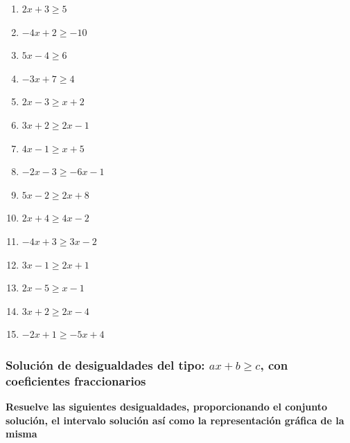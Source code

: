 \documentclass[12pt]{article}
\begin{document}
\begin{enumerate}
\def\labelenumi{\arabic{enumi}.}
\item
  \(2x + 3 \geq 5\)
\item
  \(-4x + 2 \geq -10\)
\item
  \(5x - 4 \geq 6\)
\item
  \(-3x + 7 \geq 4\)
\item
  \(2x - 3 \geq x + 2\)
\item
  \(3x + 2 \geq 2x - 1\)
\item
  \(4x - 1 \geq x + 5\)
\item
  \(-2x - 3 \geq -6x - 1\)
\item
  \(5x - 2 \geq 2x + 8\)
\item
  \(2x + 4 \geq 4x - 2\)
\item
  \(-4x + 3 \geq 3x - 2\)
\item
  \(3x - 1 \geq 2x + 1\)
\item
  \(2x - 5 \geq x - 1\)
\item
  \(3x + 2 \geq 2x - 4\)
\item
  \(-2x + 1 \geq -5x + 4\)
\end{enumerate}

\subsubsection{\texorpdfstring{Solución de desigualdades del tipo:
\(ax+b \geq c\), con coeficientes
fraccionarios}{Solución de desigualdades del tipo: ax+b \textbackslash geq c, con coeficientes fraccionarios}}\label{soluciuxf3n-de-desigualdades-del-tipo-axb-geq-c-con-coeficientes-fraccionarios}

\textbf{Resuelve las siguientes desigualdades, proporcionando el
conjunto solución, el intervalo solución así como la representación
gráfica de la misma}
\end{document}
